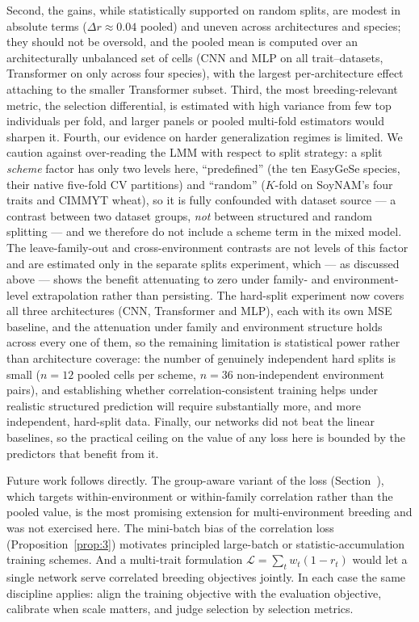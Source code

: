 Second, the gains, while statistically supported on random splits, are modest in
absolute terms ($\Delta r\approx0.04$ pooled) and uneven across architectures and
species; they should not be oversold, and the pooled mean is computed over an
architecturally unbalanced set of cells (CNN and MLP on all 
trait--datasets, Transformer on only  across four species), with the
largest per-architecture effect attaching to the smaller Transformer subset.
Third, the most breeding-relevant metric, the selection differential, is estimated
with high variance from few top individuals per fold, and larger panels or pooled
multi-fold estimators would sharpen it. Fourth, our evidence on harder
generalization regimes is limited. We caution against over-reading the LMM with
respect to split strategy: a split \emph{scheme} factor has only two levels here,
``predefined'' (the ten EasyGeSe species, their native five-fold CV partitions) and
``random'' ($K$-fold on SoyNAM's four traits and CIMMYT wheat), so it is fully
confounded with dataset source --- a contrast between two dataset groups, \emph{not}
between structured and random splitting --- and we therefore do not include a scheme
term in the mixed model. The leave-family-out and cross-environment contrasts are
not levels of this factor and are estimated only in the separate splits experiment,
which ---
as discussed above --- shows the benefit attenuating to zero under family- and
environment-level extrapolation rather than persisting. The hard-split experiment
now covers all three architectures (CNN, Transformer and MLP), each with its own
MSE baseline, and the attenuation under family and environment structure holds
across every one of them, so the remaining limitation is statistical power rather
than architecture coverage: the number of genuinely independent hard splits is
small ($n=12$ pooled cells per scheme, $n=36$ non-independent environment pairs),
and establishing whether correlation-consistent training helps under realistic
structured prediction will require substantially more, and more independent,
hard-split data. Finally, our networks did not beat the linear
baselines, so the practical ceiling on the value of any loss here is bounded by the
predictors that benefit from it.

Future work follows directly. The group-aware variant of the loss
(Section~), which targets within-environment or within-family
correlation rather than the pooled value, is the most promising extension for
multi-environment breeding and was not exercised here. The mini-batch bias of the
correlation loss (Proposition~\ref{prop:3}) motivates principled large-batch or
statistic-accumulation training schemes. And a multi-trait formulation
$\mathcal{L}=\sum_t w_t(1-r_t)$ would let a single network serve correlated
breeding objectives jointly. In each case the same discipline applies: align the
training objective with the evaluation objective, calibrate when scale matters, and
judge selection by selection metrics.
